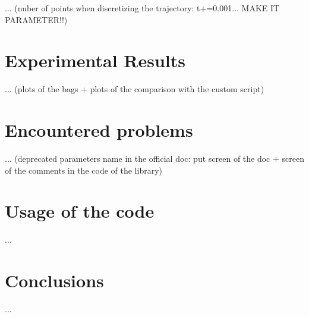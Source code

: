 \documentclass[11pt,a4paper]{article}
\begin{document}
... (nuber of points when discretizing the trajectory: t+=0.001... MAKE IT PARAMETER!!)




\section{Experimental Results}

... (plots of the bags + plots of the comparison with the custom script)




\section{Encountered problems}

... (deprecated parameters name in the official doc: put screen of the doc +
screen of the comments in the code of the library)
% 



\section{Usage of the code}

...




\section{Conclusions}

...
\end{document}
